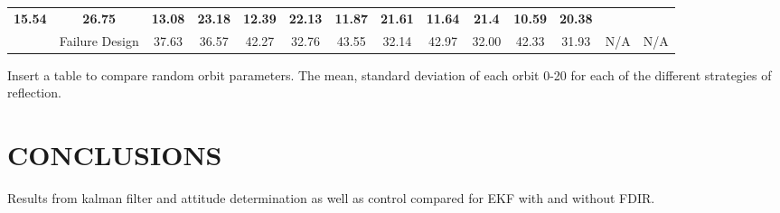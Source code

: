 \documentclass[letterpaper, 10 pt, conference]{ieeeconf}  %
\begin{document}
\begin{table*}[]
\begin{tabular}{@{}llcccccccccccc@{}}
	\multicolumn{1}{c|}{\textbf{15.54}} &
	\multicolumn{1}{c|}{\textbf{26.75}} &
	\multicolumn{1}{c|}{\textbf{13.08}} &
	\multicolumn{1}{c|}{\textbf{23.18}} &
	\multicolumn{1}{c|}{\textbf{12.39}} &
	\multicolumn{1}{c|}{\textbf{22.13}} &
	\multicolumn{1}{c|}{\textbf{11.87}} &
	\multicolumn{1}{c|}{\textbf{21.61}} &
	\multicolumn{1}{c|}{\textbf{11.64}} &
	\multicolumn{1}{c|}{\textbf{21.4}} &
	\multicolumn{1}{c|}{\textbf{10.59}} &
	\multicolumn{1}{c|}{\textbf{20.38}} \\ \cmidrule(l){2-14} 
	\multicolumn{1}{|l|}{} &
	\multicolumn{1}{l|}{Failure Design} &
	\multicolumn{1}{c|}{37.63} &
	\multicolumn{1}{c|}{36.57} &
	\multicolumn{1}{c|}{42.27} &
	\multicolumn{1}{c|}{32.76} &
	\multicolumn{1}{c|}{43.55} &
	\multicolumn{1}{c|}{32.14} &
	\multicolumn{1}{c|}{42.97} &
	\multicolumn{1}{c|}{32.00} &
	\multicolumn{1}{c|}{42.33} &
	\multicolumn{1}{c|}{31.93} &
	\multicolumn{1}{c|}{N/A} &
	\multicolumn{1}{c|}{N/A} \\ \bottomrule
\end{tabular}
\end{table*}
\newpage

Insert a table to compare random orbit parameters. The mean, standard deviation of each orbit 0-20 for each of the different strategies of reflection.

\section{CONCLUSIONS}
Results from kalman filter and attitude determination as well as control compared for EKF with and without FDIR.

\addtolength{\textheight}{-12cm}   %




\end{document}
